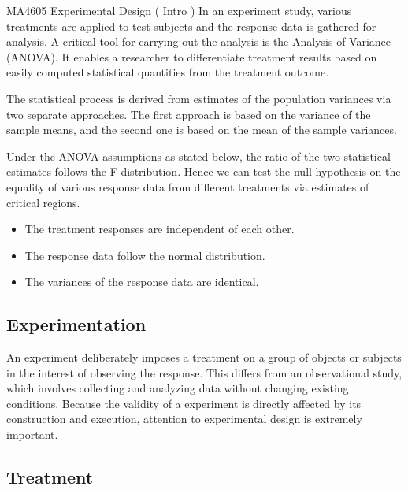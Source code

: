 MA4605 Experimental Design ( Intro )
In an experiment study, various treatments are applied to test subjects and the response data is gathered for analysis. A critical tool for carrying out the analysis is the Analysis of Variance (ANOVA). It enables a researcher to differentiate treatment results based on easily computed statistical quantities from the treatment outcome.

The statistical process is derived from estimates of the population variances via two separate approaches. The first approach is based on the variance of the sample means, and the second one is based on the mean of the sample variances. 

Under the ANOVA assumptions as stated below, the ratio of the two statistical estimates follows the F distribution. Hence we can test the null hypothesis on the equality of various response data from different treatments via estimates of critical regions.


\begin{itemize}
\item	The treatment responses are independent of each other.
\item	The response data follow the normal distribution.
\item	The variances of the response data are identical.
\end{itemize}
\subsection{Experimentation}
An experiment deliberately imposes a treatment on a group of objects or subjects in the interest of observing the response. This differs from an observational study, which involves collecting and analyzing data without changing existing conditions. Because the validity of a experiment is directly affected by its construction and execution, attention to experimental design is extremely important.
\subsection{Treatment}

